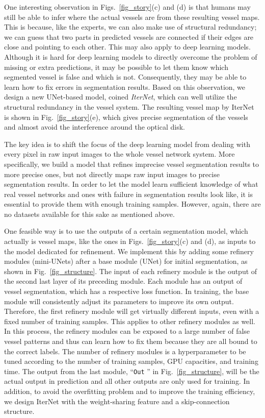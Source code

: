 \documentclass[10pt,twocolumn,letterpaper]{article}
\begin{document}
One interesting observation in Figs.~\ref{fig_story}(c) and (d) is that humans may still be able to infer where the actual vessels are from these resulting vessel maps. This is because, like the experts, we can also make use of structural redundancy; we can guess that two parts in predicted vessels are connected if their edges are close and pointing to each other. This may also apply to deep learning models. Although it is hard for deep learning models to directly overcome the problem of missing or extra predictions, it may be possible to let them know which segmented vessel is false and which is not. Consequently, they may be able to learn how to fix errors in segmentation results. Based on this observation, we design a new UNet-based model, coined \textit{IterNet}, which can well utilize the structural redundancy in the vessel system. The resulting vessel map by IterNet is shown in Fig.~\ref{fig_story}(e), which gives precise segmentation of the vessels and almost avoid the interference around the optical disk.

The key idea is to shift the focus of the deep learning model from dealing with every pixel in raw input images to the whole vessel network system. More specifically, we build a model that refines imprecise vessel segmentation results to more precise ones, but not directly maps raw input images to precise segmentation results. In order to let the model learn sufficient knowledge of what real vessel networks and ones with failure in segmentation results look like, it is essential to provide them with enough training samples. However, again, there are no datasets available for this sake as mentioned above. 

One feasible way is to use the outputs of a certain segmentation model, which actually is vessel maps, like the ones in Figs.~\ref{fig_story}(c) and (d), as inputs to the model dedicated for refinement. We implement this by adding some refinery modules (mini-UNets) after a base module (UNet) for initial segmentation, as shown in Fig.~\ref{fig_structure}. The input of each refinery module is the output of the second last layer of its preceding module. Each module has an output of vessel segmentation, which has a respective loss function. In training, the base module will consistently adjust its parameters to improve its own output. Therefore, the first refinery module will get virtually different inputs, even with a fixed number of training samples. This applies to other refinery modules as well. In this process, the refinery modules can be exposed to a large number of false vessel patterns and thus can learn how to fix them because they are all bound to the correct labels. The number of refinery modules is a hyperparameter to be tuned according to the number of training samples, GPU capacities, and training time. The output from the last module, ``\texttt{Out} '' in Fig.~\ref{fig_structure}, will be the actual output in prediction and all other outputs are only used for training. In addition, to avoid the overfitting problem and to improve the training efficiency, we design IterNet with the weight-sharing feature and a skip-connection structure.
\end{document}

